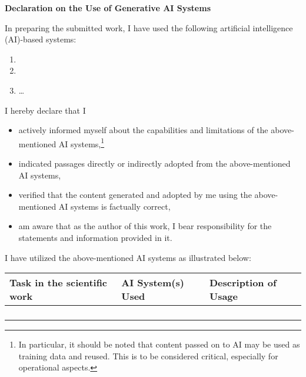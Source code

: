 {%
{\LARGE\textsf{\textbf{Declaration on the Use of Generative AI Systems}}\bigskip}

In preparing the submitted work, I have used the following artificial intelligence (AI)-based systems:

\begin{enumerate}
\item
\item
\item \ldots
\end{enumerate}

I hereby declare that I

\begin{itemize}
  \item actively informed myself about the capabilities and limitations of the above-mentioned AI systems,\footnote{In particular, it should be noted that content passed on to AI may be used as training data and reused. This is to be considered critical, especially for operational aspects.}
  \item indicated passages directly or indirectly adopted from the above-mentioned AI systems,
%
%
  \item verified that the content generated and adopted by me using the above-mentioned AI systems is factually correct,
  \item am aware that as the author of this work, I bear responsibility for the statements and information provided in it.
\end{itemize}

I have utilized the above-mentioned AI systems as illustrated below: 

\begin{center}
\begin{tabular}{|p{4cm}|p{3cm}|p{7cm}|}
    \hline
    \textbf{Task in the scientific work} &
%
%
%
	 \textbf{AI System(s) Used} & \textbf{Description of Usage} \\
    \hline
    & & \\ %
    \hline
    & & \\ %
    \hline
    & & \\
    \hline
    & & \\
    \hline
  \end{tabular}
\end{center}
}
